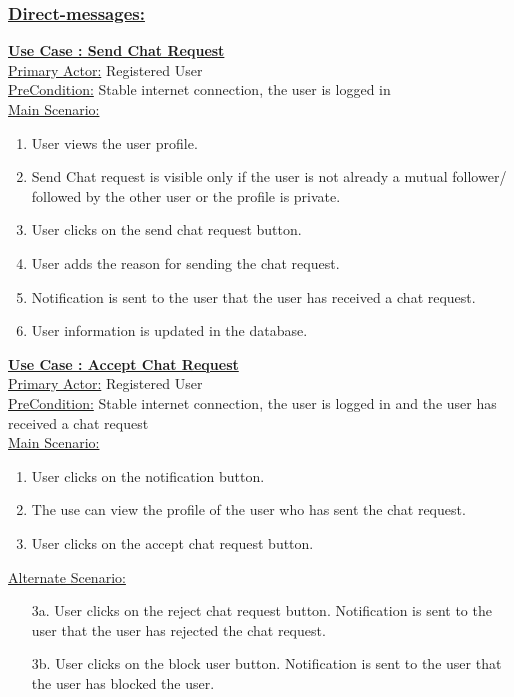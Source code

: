 \documentclass[conference,compsoc]{IEEEtran}
\newcounter{UC}
\newcommand{\nextU}{\stepcounter{UC}\theUC}
\begin{document}
\subsubsection{\underline{Direct-messages:}}
\vspace{0.2cm}
\underline{\textbf{Use Case \nextU: Send Chat Request}}\\

\underline{Primary Actor:} Registered User\\

\underline{PreCondition:} Stable internet connection, the user is logged in\\

\underline{Main Scenario:}\\
\begin{enumerate}
    \item User views the user profile.
    \item Send Chat request is visible only if the user is not already a mutual follower/ followed by the other user or the profile is private.
    \item User clicks on the send chat request button.
    \item User adds the reason for sending the chat request.
    \item Notification is sent to the user that the user has received a chat request.
    \item User information is updated in the database.
\end{enumerate}

\underline{\textbf{Use Case \nextU: Accept Chat Request}}\\

\underline{Primary Actor:} Registered User\\

\underline{PreCondition:} Stable internet connection, the user is logged in and the user has received a chat request\\

\underline{Main Scenario:}\\
\begin{enumerate}
    \item User clicks on the notification button.
    \item The use can view the profile of the user who has sent the chat request.
    \item User clicks on the accept chat request button.
\end{enumerate}

\underline{Alternate Scenario:}\\
\begin{enumerate}
    \item [3a.] User clicks on the reject chat request button. Notification is sent to the user that the user has rejected the chat request.
    \item [3b.] User clicks on the block user button. Notification is sent to the user that the user has blocked the user.
\end{enumerate}
\end{document}
